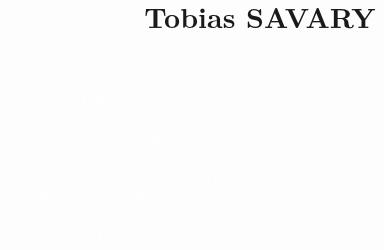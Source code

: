 \documentclass[9pt, oneside, a4paper, titlepage]{extarticle}
\title{Tobias SAVARY}
\date{}
\begin{document}
    
    \begin{tcolorbox}
        \begin{minipage}{0.3\linewidth}
            \hspace*{1cm}
        \end{minipage}%
        \hspace{1cm}%
        \begin{minipage}{0.6\linewidth}
            \begin{center}
                \Huge{\textcolor{white}{Tobias SAVARY}} \\
                \vspace*{0.5cm}
                
                \Large{\textcolor{white}{Candidature pour le stage \emph{Etude des déterminants \\ de la demande énergétique dans les projections \\ de consommation à 2050 (2024-115527)} \\ à partir de janvier 2025\\}}
                \vspace*{0.5cm}
                \Large{\textcolor{white}{\emph{Etudiant en Génie Informatique \\Université de Technologie de Compiègne (UTC) \\}}}
            \end{center}
        \end{minipage}%
    \end{tcolorbox}
\end{document}
